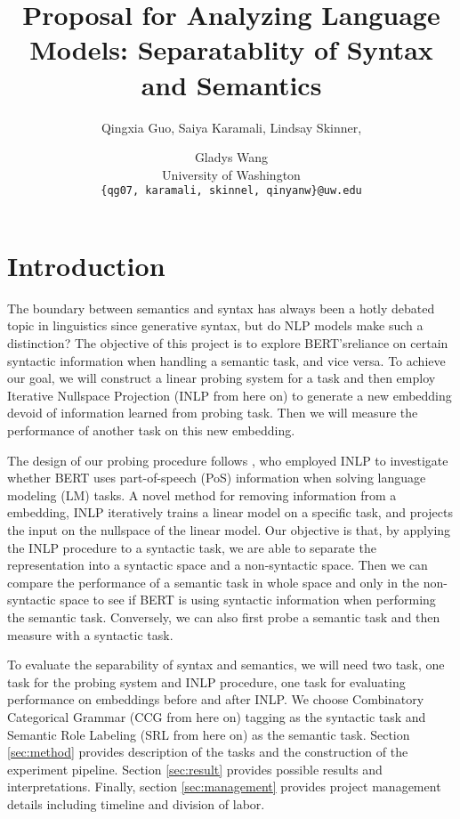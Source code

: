 \documentclass[11pt,a4paper]{article}
\title{Proposal for Analyzing Language Models: Separatablity of Syntax and Semantics}
\author{Qingxia Guo, Saiya Karamali, Lindsay Skinner, \and Gladys Wang
 \\ University of Washington \\ 
\texttt{\{qg07, karamali, skinnel, qinyanw\}@uw.edu}\\ 
}
\date{}
\begin{document}
\maketitle

\section{Introduction}

The boundary between semantics and syntax has always been a hotly debated topic in linguistics since generative syntax, but do NLP models make such a distinction? The objective of this project is to explore BERT\rq s\citep{bert}reliance on certain syntactic information when handling a semantic task, and vice versa. To achieve our goal, we will construct a linear probing system for a task and then employ Iterative Nullspace Projection (INLP from here on) \citep{inlp} to generate a new embedding devoid of information learned from probing task. Then we will measure the performance of another task on this new embedding.

The design of our probing procedure follows \citealp{amnesia}, who employed INLP to investigate whether BERT uses part-of-speech (PoS) information when solving language modeling (LM) tasks. A novel method for removing information from a embedding, INLP iteratively trains a linear model on a specific task, and projects the input on the nullspace of the linear model. Our objective is that, by applying the INLP procedure to a syntactic task, we are able to separate the representation into a syntactic space and a non-syntactic space. Then we can compare the performance of a semantic task in whole space and only in the non-syntactic space to see if BERT is using syntactic information when performing the semantic task. Conversely, we can also first probe a semantic task and then measure with a syntactic task. 

To evaluate the separability of syntax and semantics, we will need two task, one task for the probing system and INLP procedure, one task for evaluating performance on embeddings before and after INLP. We choose Combinatory Categorical Grammar (CCG from here on) tagging \citep{ccg-bank} as the syntactic task and Semantic Role Labeling (SRL from here on) as the semantic task. Section \ref{sec:method} provides description of the tasks and the construction of the experiment pipeline. Section \ref{sec:result} provides possible results and interpretations. Finally, section \ref{sec:management} provides project management details including timeline and division of labor.
\end{document}
